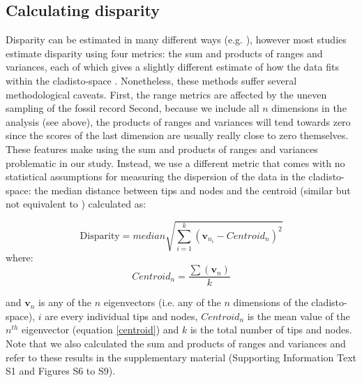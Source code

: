 \documentclass[10pt,letterpaper]{article}
\begin{document}
\subsection*{Calculating disparity}
Disparity can be estimated in many different ways (e.g. \cite{Wills1994,Ciampaglio2004,thorneresetting2011,hopkinsdecoupling2013,huang2015origins}), however most studies estimate disparity using four metrics: the sum and products of ranges and variances, each of which gives a slightly different estimate of how the data fits within the cladisto-space \cite{Foote01071994,Wills1994,brusatte50,Brusatte12092008,cisneros2010,thorneresetting2011,prentice2011,brusattedinosaur2012,toljagictriassic-jurassic2013,ruta2013,bentonmodels2014,bensonfaunal2014}.
Nonetheless, these methods suffer several methodological caveats.
First, the range metrics are affected by the uneven sampling of the fossil record \cite{Butler2012}
Second, because we include all $n$ dimensions in the analysis (see above), the products of ranges and variances will tend towards zero since the scores of the last dimension are usually really close to zero themselves. 
These features make using the sum and products of ranges and variances problematic in our study.
Instead, we use a different metric that comes with no statistical assumptions for measuring the dispersion of the data in the cladisto-space: the median distance between tips and nodes and the centroid (similar but not equivalent to \cite{Wills1994,kornextinction2013,huang2015origins}) calculated as:

\begin{equation}
   \text{Disparity}=median{\displaystyle\sqrt{\sum_{i=1}^{k}{(\mathbf{v}_{n_{i}}-Centroid_{n})^2}}} %
    \label{disparity}
\end{equation}
where:
\begin{equation}
    Centroid_{n}=\frac{\displaystyle\sum(\mathbf{v}_{n})}{k} 
    \label{centroid}
\end{equation}

\noindent
and $\mathbf{v}_{n}$ is any of the $n$ eigenvectors (i.e. any of the $n$ dimensions of the cladisto-space), $i$ are every individual tips and nodes, $Centroid_{n}$ is the mean value of the $n^{th}$ eigenvector (equation \ref{centroid}) and $k$ is the total number of tips and nodes.
Note that we also calculated the sum and products of ranges and variances and refer to these results in the supplementary material (Supporting Information Text S1 and Figures S6 to S9).
\end{document}
